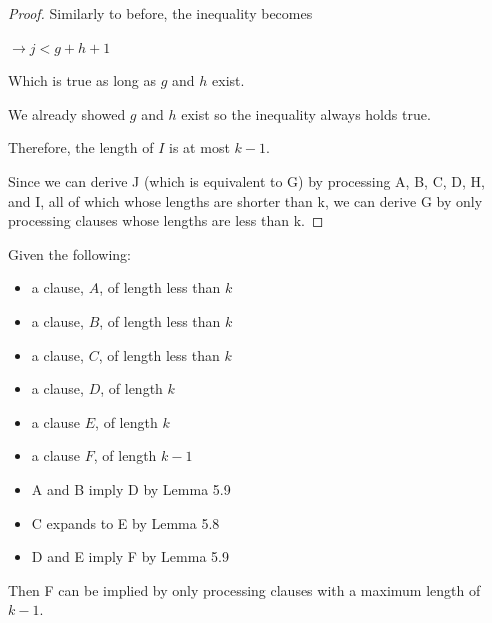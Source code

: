 \documentclass[manuscript]{acmart}
\begin{document}
\begin{proof}
        Similarly to before, the inequality becomes
        
        $\rightarrow j < g + h + 1$

        Which is true as long as $g$ and $h$ exist. 

        We already showed $g$ and $h$ exist so the inequality always 
        holds true.

        Therefore, the length of $I$ is at most $k - 1$.

        Since we can derive J (which is equivalent to G) by processing
        A, B, C, D, H, and I, all of which whose lengths are shorter than k, 
        we can derive G by only processing clauses whose lengths are 
        less than k.
    \end{proof}

    \begin{lemma}
        Given the following:
        \begin{itemize}
            \item a clause, $A$, of length less than $k$
            \item a clause, $B$, of length less than $k$
            \item a clause, $C$, of length less than $k$
            \item a clause, $D$, of length $k$
            \item a clause $E$, of length $k$
            \item a clause $F$, of length $k - 1$
            \item A and B imply D by Lemma 5.9
            \item C expands to E by Lemma 5.8
            \item D and E imply F by Lemma 5.9
        \end{itemize}
        Then F can be implied by only processing clauses with a maximum
        length of $k-1$.
    \end{lemma}
\end{document}
